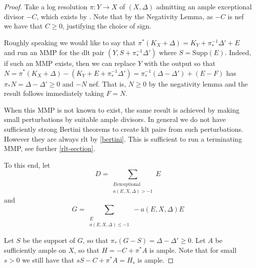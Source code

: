 \begin{proof}
	
	
	Take a log resolution $\pi:Y \to X$ of $(X,\Delta)$ admitting an ample exceptional divisor $-C$, which exists by \cite[Theorem 1]{kollar2021resolution}. Note that by the Negativity Lemma, as $-C$ is nef we have that $C \geq 0$, justifying the choice of sign.
	
	Roughly speaking we would like to say that $\pi^{*}(K_{X}+\Delta)=K_{Y}+\pi_{*}^{-1}\Delta'+E$ and run an MMP for the dlt pair $(Y,S+\pi_{*}^{-1}\Delta')$ where $S=\text{Supp}(E)$. Indeed, if such an MMP exists, then we can replace $Y$ with the output so that $N=\pi^{*}(K_{X}+\Delta)-(K_{Y}+E+\pi_{*}^{-1}\Delta')= \pi_{*}^{-1}(\Delta-\Delta')+(E-F)$ has $\pi_{*}N=\Delta-\Delta' \geq 0$ and $-N$ nef. That is, $N \geq 0$ by the negativity lemma and the result follows immediately taking $F=N$.  
	
	When this MMP is not known to exist, the same result is achieved by making small perturbations by suitable ample divisors. In general we do not have sufficiently strong Bertini theorems to create klt pairs from such perturbations. However they are always rlt by \autoref{bertini}. This is sufficient to run a terminating MMP, see further \autoref{rlt-section}.
	
	To this end, let \[D= \sum_{\substack{E \text{exceptional} \\ a(E,X,\Delta) > -1}} E\]
	and 
		\[G = \sum_{\substack{E \\ a(E,X,\Delta) \leq  -1}} -a(E,X,\Delta)E\]
		
	Let $S$ be the support of $G$, so that $\pi_{*}(G-S)=\Delta-\Delta' \geq 0.$ Let $A$ be sufficiently ample on $X$, so that $H=-C+\pi^{*}A$ is ample. Note that for small $s > 0$ we still have that $sS -C+\pi^{*}A=H_{s}$ is ample.
	

\end{proof}
